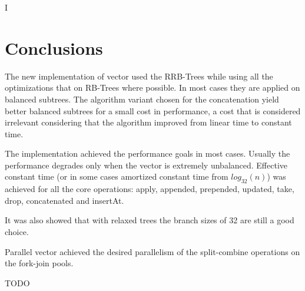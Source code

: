 I%

\chapter{Conclusions} %

\label{Conclusions} %




The new implementation of vector used the RRB-Trees while using all the optimizations that on RB-Trees where possible. In most cases they are applied on balanced subtrees. The algorithm variant chosen for the concatenation yield better balanced subtrees for a small cost in performance, a cost that is considered irrelevant considering that the algorithm improved from linear time to constant time.

The implementation achieved the performance goals in most cases. Usually the performance degrades only when the vector is extremely unbalanced. Effective constant time (or in some cases amortized constant time from $log_{32}(n)$) was achieved for all the core operations: apply, appended, prepended, updated, take, drop, concatenated and insertAt.

It was also showed that with relaxed trees the branch sizes of 32 are still a good choice.

Parallel vector achieved the desired parallelism of the split-combine operations on the fork-join pools. 


\color{red} TODO \color{black}

